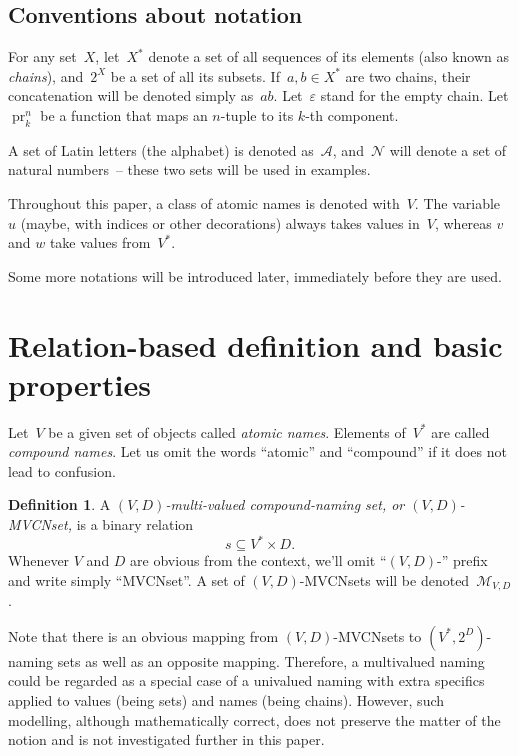 \documentclass{article}
\theoremstyle{definition}
\newtheorem{Df}{Definition}
\newcommand{\setcharmvcn}{M}
\newcommand{\setsymbol}[3]{\mathcal{#1}_{#2,#3}}
\newcommand{\setmvcn}[2]{\setsymbol{\setcharmvcn}{#1}{#2}}
\newcommand{\seta}{\mathcal{A}}
\newcommand{\setn}{\mathcal{N}}
\newcommand{\proj}[2]{\operatorname{pr}^{#1}_{#2}}
\begin{document}
\subsection*{Conventions about notation}

For any set~$X$, let~$X^\ast$ denote a set of all sequences of its elements
(also known as \emph{chains}), and~$2^X$ be a set of all its subsets.
If~$a,b\in X^\ast$ are two chains, their concatenation will be denoted simply
as~$ab$. Let~$\varepsilon$ stand for the empty chain.
Let $\proj{n}{k}$ be a function that maps an $n$-tuple to its $k$-th component.

A set of Latin letters (the alphabet) is denoted as~$\seta$,
and~$\setn$ will denote a set of natural numbers~-- these two sets will be
used in examples.

Throughout this paper, a class of atomic names is denoted with~$V$. The
variable~$u$ (maybe, with indices or other decorations) always takes values
in~$V$, whereas $v$ and $w$ take values from~$V^\ast$.

Some more notations will be introduced later, immediately before they are used.



\section{Relation-based definition and basic properties}

Let~$V$ be a given set of objects called \emph{atomic names}. Elements
of~$V^\ast$ are called \emph{compound names}. Let us omit the words ``atomic''
and ``compound'' if it does not lead to confusion.

\begin{Df}\label{df:mvcn}
A \emph{$(V,D)$-multi-valued compound-naming set, or $(V,D)$-MVCNset,} is a binary
relation
\[
  s \subseteq V^\ast \times D .
\]
Whenever $V$ and $D$ are obvious from the context, we'll omit ``$(V,D)$-''
prefix and write simply ``MVCNset''. A set of $(V,D)$-MVCNsets will be
denoted~$\setmvcn{V}{D}$.
\end{Df}

Note that there is an obvious mapping from $(V,D)$-MVCNsets to $(V^\ast,
2^D)$-naming sets as well as an opposite mapping.  Therefore, a multivalued
naming could be regarded as a special case of a univalued naming with extra
specifics applied to values (being sets) and names (being chains). However,
such modelling, although mathematically correct, does not preserve the matter
of the notion and is not investigated further in this paper.
\end{document}
